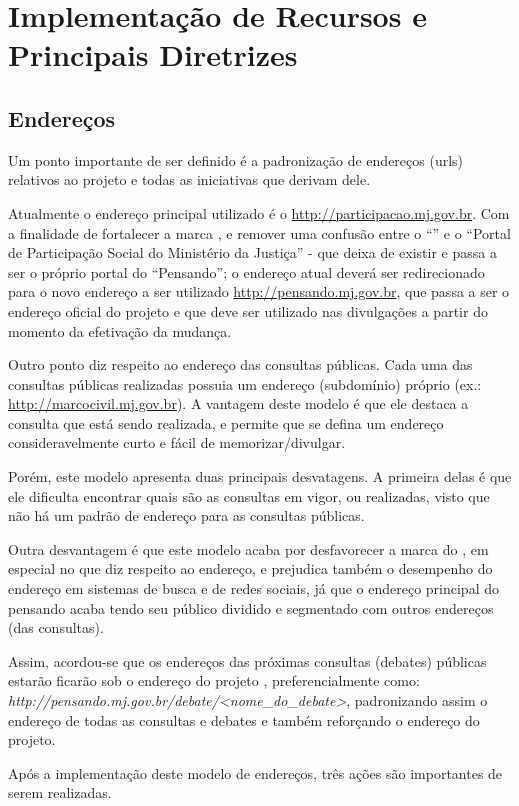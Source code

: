 \section{Implementação de Recursos e Principais Diretrizes}\label{sec:recursos}
\subsection{Endereços}
Um ponto importante de ser definido é a padronização de endereços (urls) relativos ao projeto \ppod e todas as iniciativas que derivam dele.

Atualmente o endereço principal utilizado é o \url{http://participacao.mj.gov.br}. Com a finalidade de fortalecer a marca \ppod, e remover uma confusão entre o ``\ppod'' e o ``Portal de Participação Social do Ministério da Justiça'' - que deixa de existir e passa a ser o próprio portal do ``Pensando''; o endereço atual deverá ser redirecionado para o novo endereço a ser utilizado \url{http://pensando.mj.gov.br}, que passa a ser o endereço oficial do projeto e que deve ser utilizado nas divulgações a partir do momento da efetivação da mudança.

Outro ponto diz respeito ao endereço das consultas públicas. Cada uma das consultas públicas realizadas possuia um endereço (subdomínio) próprio (ex.: \url{http://marcocivil.mj.gov.br}). A vantagem deste modelo é que ele destaca a consulta que está sendo realizada, e permite que se defina um endereço consideravelmente curto e fácil de memorizar/divulgar.

Porém, este modelo apresenta duas principais desvatagens. A primeira delas é que ele dificulta encontrar quais são as consultas em vigor, ou realizadas, visto que não há um padrão de endereço para as consultas públicas.

Outra desvantagem é que este modelo acaba por desfavorecer a marca do \ppod, em especial no que diz respeito ao endereço, e prejudica também o desempenho do endereço em sistemas de busca e de redes sociais, já que o endereço principal do pensando acaba tendo seu público dividido e segmentado com outros endereços (das consultas).

Assim, acordou-se que os endereços das próximas consultas (debates) públicas estarão ficarão sob o endereço do projeto \ppod, preferencialmente como: \textit{http://pensando.mj.gov.br/debate/<nome\_do\_debate>}, padronizando assim o endereço de todas as consultas e debates e também reforçando o endereço do projeto.

Após a implementação deste modelo de endereços, três ações são importantes de serem realizadas.

